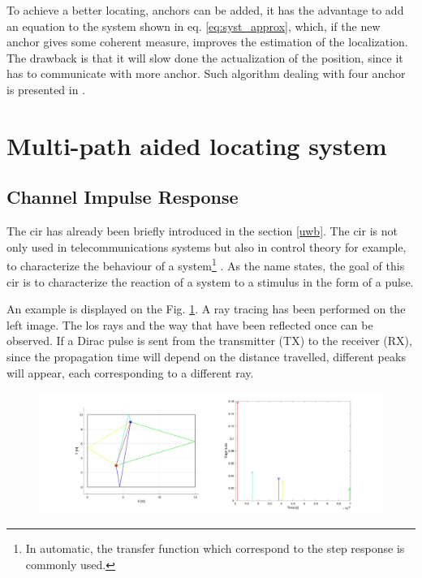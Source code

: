 To achieve a better locating, anchors can be added, it has the advantage to add an equation to the system shown in eq. \ref{eq:syst_approx}, which, if the new anchor gives some coherent measure, improves the estimation of the localization. The drawback is that it will slow done the actualization of the position, since it has to communicate with more anchor. Such algorithm dealing with four anchor is presented in \cite{guyard2019navigation}.

\section{Multi-path aided locating system}

\subsection{Channel Impulse Response}

The \gls{cir} has already been briefly introduced in the section \ref{uwb}. The \gls{cir} is not only used in telecommunications systems but also in control theory for example, to characterize the behaviour of a system\footnote{In automatic, the transfer function which correspond to the step response is commonly used.} \cite{garonne2019course}. As the name states, the goal of this \gls{cir} is to characterize the reaction of a system to a stimulus in the form of a pulse.
\vspace{2mm}

An example is displayed on the Fig. \ref{fig:cir_ex1}. A ray tracing has been performed on the left image. The \gls{los} rays and the way that have been reflected once can be observed. If a Dirac pulse is sent from the transmitter (TX) to the receiver (RX), since the propagation time will depend on the distance travelled, different peaks will appear, each corresponding to a different ray.

\begin{figure}[H]
	\centering
	\includegraphics[width=.95\linewidth]{Images/Anchor-mpc.jpg}
	\caption{}
	\label{fig:cir_ex1}
\end{figure}

